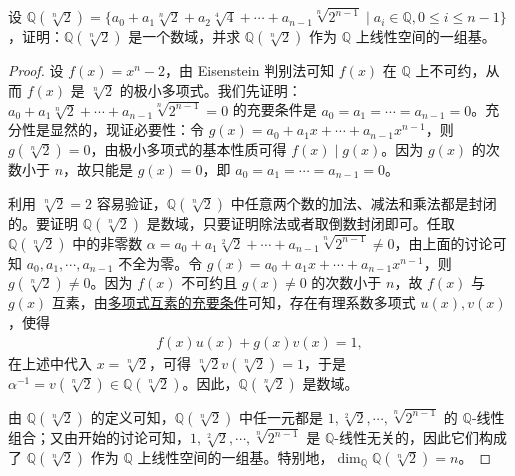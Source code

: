 \documentclass[../../main.tex]{subfiles}%
\begin{document}
\begin{example}
设 $\mathbb{Q}(\sqrt[n]{2}) = \{a_0 + a_1 \sqrt[n]{2} + a_2 \sqrt[4]{4} + \cdots + a_{n-1} \sqrt[n]{2^{n-1}} \mid a_i \in \mathbb{Q}, 0 \leqslant  i \leqslant  n - 1\}$，证明：$\mathbb{Q}(\sqrt[n]{2})$ 是一个数域，并求 $\mathbb{Q}(\sqrt[n]{2})$ 作为 $\mathbb{Q}$ 上线性空间的一组基。
\end{example}
\begin{proof}
设 $f(x) = x^n - 2$，由 Eisenstein 判别法可知 $f(x)$ 在 $\mathbb{Q}$ 上不可约，从而 $f(x)$ 是 $\sqrt[n]{2}$ 的极小多项式。我们先证明：$a_0 + a_1 \sqrt[n]{2} + \cdots + a_{n-1} \sqrt[n]{2^{n-1}} = 0$ 的充要条件是 $a_0 = a_1 = \cdots = a_{n-1} = 0$。充分性是显然的，现证必要性：令 $g(x) = a_0 + a_1 x + \cdots + a_{n-1} x^{n-1}$，则 $g(\sqrt[n]{2}) = 0$，由极小多项式的基本性质可得 $f(x) \mid g(x)$。因为 $g(x)$ 的次数小于 $n$，故只能是 $g(x) = 0$，即 $a_0 = a_1 = \cdots = a_{n-1} = 0$。

利用 $\sqrt[n]{2} = 2$ 容易验证，$\mathbb{Q}(\sqrt[n]{2})$ 中任意两个数的加法、减法和乘法都是封闭的。要证明 $\mathbb{Q}(\sqrt[n]{2})$ 是数域，只要证明除法或者取倒数封闭即可。任取 $\mathbb{Q}(\sqrt[n]{2})$ 中的非零数 $\alpha = a_0 + a_1 \sqrt[2]{2} + \cdots + a_{n-1} \sqrt[n]{2^{n-1}} \neq 0$，由上面的讨论可知 $a_0, a_1, \cdots, a_{n-1}$ 不全为零。令 $g(x) = a_0 + a_1 x + \cdots + a_{n-1} x^{n-1}$，则 $g(\sqrt[n]{2}) \neq 0$。因为 $f(x)$ 不可约且 $g(x) \neq 0$ 的次数小于 $n$，故 $f(x)$ 与 $g(x)$ 互素，由\hyperref[theorem:多项式互素的充要条件]{多项式互素的充要条件}可知，存在有理系数多项式 $u(x), v(x)$，使得
\begin{align*}
f(x)u(x) + g(x)v(x) = 1,
\end{align*}
在上述中代入 $x = \sqrt[n]{2}$，可得 $\sqrt[n]{2} v(\sqrt[n]{2}) = 1$，于是 $\alpha^{-1} = v(\sqrt[n]{2}) \in \mathbb{Q}(\sqrt[n]{2})$。因此，$\mathbb{Q}(\sqrt[n]{2})$ 是数域。

由 $\mathbb{Q}(\sqrt[n]{2})$ 的定义可知，$\mathbb{Q}(\sqrt[n]{2})$ 中任一元都是 $1, \sqrt[2]{2}, \cdots, \sqrt[n]{2^{n-1}}$ 的 $\mathbb{Q}$-线性组合；又由开始的讨论可知，$1, \sqrt[2]{2}, \cdots, \sqrt[n]{2^{n-1}}$ 是 $\mathbb{Q}$-线性无关的，因此它们构成了 $\mathbb{Q}(\sqrt[n]{2})$ 作为 $\mathbb{Q}$ 上线性空间的一组基。特别地，$\dim_{\mathbb{Q}} \mathbb{Q}(\sqrt[n]{2}) = n$。
\end{proof}
\end{document}
